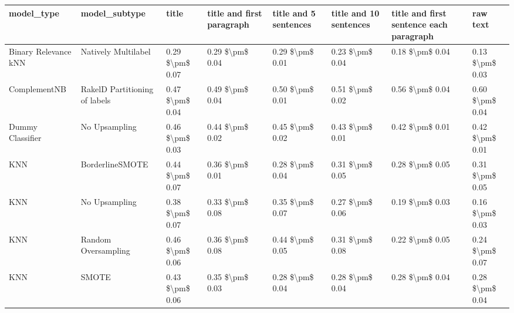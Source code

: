 \begin{tabular}{llllllll}
\toprule
                     model\_type &                 model\_subtype &           title & title and first paragraph & title and 5 sentences & title and 10 sentences & title and first sentence each paragraph &            raw text \\
\midrule
           Binary Relevance kNN &           Natively Multilabel & 0.29 \$\textbackslash pm\$ 0.07 &           0.29 \$\textbackslash pm\$ 0.04 &       0.29 \$\textbackslash pm\$ 0.01 &        0.23 \$\textbackslash pm\$ 0.04 &                         0.18 \$\textbackslash pm\$ 0.04 &     0.13 \$\textbackslash pm\$ 0.03 \\
                   ComplementNB & RakelD Partitioning of labels & 0.47 \$\textbackslash pm\$ 0.04 &           0.49 \$\textbackslash pm\$ 0.04 &       0.50 \$\textbackslash pm\$ 0.01 &        0.51 \$\textbackslash pm\$ 0.02 &                         0.56 \$\textbackslash pm\$ 0.04 &     0.60 \$\textbackslash pm\$ 0.04 \\
               Dummy Classifier &                 No Upsampling & 0.46 \$\textbackslash pm\$ 0.03 &           0.44 \$\textbackslash pm\$ 0.02 &       0.45 \$\textbackslash pm\$ 0.02 &        0.43 \$\textbackslash pm\$ 0.01 &                         0.42 \$\textbackslash pm\$ 0.01 &     0.42 \$\textbackslash pm\$ 0.01 \\
                            KNN &               BorderlineSMOTE & 0.44 \$\textbackslash pm\$ 0.07 &           0.36 \$\textbackslash pm\$ 0.01 &       0.28 \$\textbackslash pm\$ 0.04 &        0.31 \$\textbackslash pm\$ 0.05 &                         0.28 \$\textbackslash pm\$ 0.05 &     0.31 \$\textbackslash pm\$ 0.05 \\
                            KNN &                 No Upsampling & 0.38 \$\textbackslash pm\$ 0.07 &           0.33 \$\textbackslash pm\$ 0.08 &       0.35 \$\textbackslash pm\$ 0.07 &        0.27 \$\textbackslash pm\$ 0.06 &                         0.19 \$\textbackslash pm\$ 0.03 &     0.16 \$\textbackslash pm\$ 0.03 \\
                            KNN &           Random Oversampling & 0.46 \$\textbackslash pm\$ 0.06 &           0.36 \$\textbackslash pm\$ 0.08 &       0.44 \$\textbackslash pm\$ 0.05 &        0.31 \$\textbackslash pm\$ 0.08 &                         0.22 \$\textbackslash pm\$ 0.05 &     0.24 \$\textbackslash pm\$ 0.07 \\
                            KNN &                         SMOTE & 0.43 \$\textbackslash pm\$ 0.06 &           0.35 \$\textbackslash pm\$ 0.03 &       0.28 \$\textbackslash pm\$ 0.04 &        0.28 \$\textbackslash pm\$ 0.04 &                         0.28 \$\textbackslash pm\$ 0.04 &     0.28 \$\textbackslash pm\$ 0.04 \\

\end{tabular}
